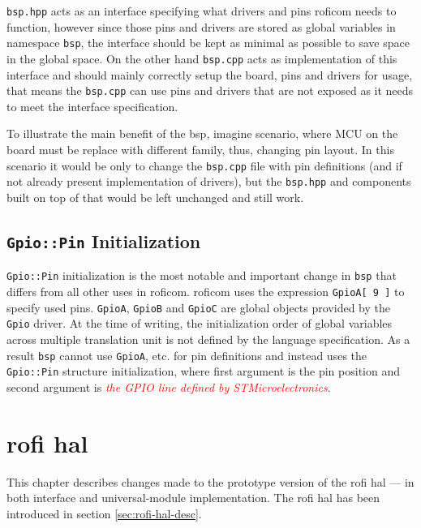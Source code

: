 \documentclass[
  digital,     %
  oneside,     %
  nosansbold,  %
  nocolorbold, %
  lof,         %
  lot,         %
]{fithesis4}
\newcommand{\TODO}[1]{\textcolor{red}{\textit{#1}}}
\begin{document}
{{{\verb|bsp.hpp| acts as an interface specifying what drivers and pins \acrshort{roficom} needs to function, however since those pins and drivers are stored as global variables in namespace \lstinline{bsp}, the interface should be kept as minimal as possible to save space in the global space. On the other hand \verb|bsp.cpp| acts as implementation of this interface and should mainly correctly setup the board, pins and drivers for usage, that means the \verb|bsp.cpp| can use pins and drivers that are not exposed as it needs to meet the interface specification.

To illustrate the main benefit of the \acrshort{bsp}, imagine scenario, where MCU on the board must be replace with different family, thus, changing pin layout. In this scenario it would be only to change the \verb|bsp.cpp| file with pin definitions (and if not already present implementation of drivers), but the \verb|bsp.hpp| and components built on top of that would be left unchanged and still work.

\section[ Gpio::Pin Initialization ]{ \lstinline|Gpio::Pin| Initialization }
\lstinline{Gpio::Pin} initialization is the most notable and important change in \lstinline{bsp} that differs from all other uses in \acrshort{roficom}. \acrshort{roficom} uses the expression \lstinline{GpioA[ 9 ]} to specify used pins. \lstinline{GpioA}, \lstinline{GpioB} and \lstinline{GpioC} are global objects provided by the \lstinline{Gpio} driver. At the time of writing, the initialization order of global variables across multiple translation unit is not defined by the language specification. As a result \lstinline{bsp} cannot use \lstinline{GpioA}, etc. for pin definitions and instead uses the \lstinline{Gpio::Pin} structure initialization, where first argument is the pin position and second argument is \TODO{the GPIO line defined by STMicroelectronics}.

\chapter[ RoFI Hardware Abstraction Layer ]{ \acrshort{rofi} \acrlong{hal} } \label{cht:rofig-hal}

This chapter describes changes made to the prototype version of the \acrshort{rofi} \acrshort{hal} --- in both interface and \gls{universal-module} implementation. The \acrshort{rofi} \acrshort{hal} has been introduced in section \ref{sec:rofi-hal-desc}.
}}}
\end{document}
